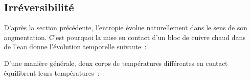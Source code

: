 \documentclass[../../main/main.tex]{subfiles}
\begin{document}
\subsection{Irréversibilité}
D'après la section précédente, l'entropie évolue naturellement dans le sens de
son augmentation. C'est pourquoi la mise en contact d'un bloc de cuivre chaud
dans de l'eau donne l'évolution temporelle suivante~:
\begin{figure}[htbp]
	\centering
\end{figure}

D'une manière générale, deux corps de températures différentes en contact
équilibrent leurs températures~:

\begin{figure}[htbp]
	\centering
\end{figure}
\end{document}
